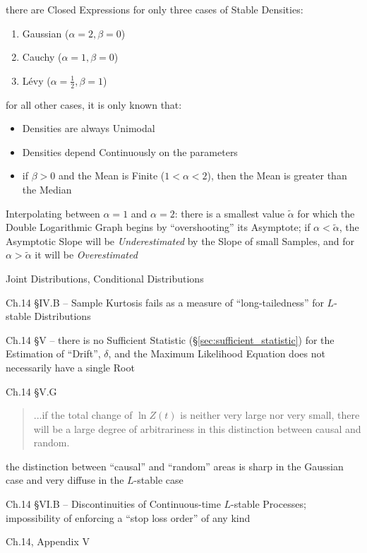 there are Closed Expressions for only three cases of Stable Densities:
\begin{enumerate}
  \item Gaussian ($\alpha = 2, \beta = 0$)
  \item Cauchy ($\alpha = 1, \beta = 0$)
  \item L\'evy ($\alpha = \frac{1}{2}, \beta = 1$)
\end{enumerate}
for all other cases, it is only known that:
\begin{itemize}
  \item Densities are always Unimodal
  \item Densities depend Continuously on the parameters
  \item if $\beta > 0$ and the Mean is Finite ($1 < \alpha < 2$), then the Mean
    is greater than the Median
\end{itemize}

Interpolating between $\alpha = 1$ and $\alpha = 2$: there is a smallest value
$\tilde{\alpha}$ for which the Double Logarithmic Graph begins by
``overshooting'' its Asymptote; if $\alpha < \tilde{\alpha}$, the Asymptotic
Slope will be \emph{Underestimated} by the Slope of small Samples, and for
$\alpha > \tilde{\alpha}$ it will be \emph{Overestimated}

Joint Distributions, Conditional Distributions

Ch.14 \S IV.B -- Sample Kurtosis fails as a measure of ``long-tailedness'' for
$L$-stable Distributions

Ch.14 \S V -- there is no Sufficient Statistic
(\S\ref{sec:sufficient_statistic}) for the Estimation of ``Drift'', $\delta$,
and the Maximum Likelihood Equation does not necessarily have a single Root

Ch.14 \S V.G

\begin{quote}
  ...if the total change of $\ln Z(t)$ is neither very large nor very small,
  there will be a large degree of arbitrariness in this distinction between
  causal and random.
\end{quote}

the distinction between ``causal'' and ``random'' areas is sharp in the Gaussian
case and very diffuse in the $L$-stable case

Ch.14 \S VI.B -- Discontinuities of Continuous-time $L$-stable Processes;
impossibility of enforcing a ``stop loss order'' of any kind

Ch.14, Appendix V


